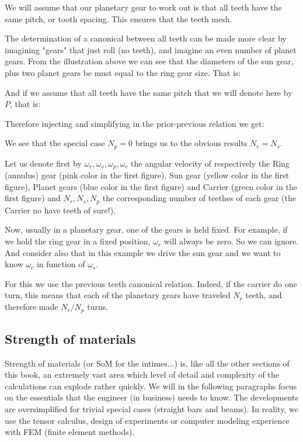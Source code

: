 	We will assume that our planetary gear to work out is that all teeth have the same pitch, or tooth spacing. This ensures that the teeth mesh.
	
	The determination of a canonical between all teeth can  be made more clear by imagining "gears" that just roll (no teeth), and imagine an even number of planet gears. From the illustration above we can see that the diameters of the sun gear, plus two planet gears be must equal to the ring gear size. That is:
	
	And if we assume that all teeth have the same pitch that we will denote here by $P$, that is:
	
	Therefore injecting and simplifying in the prior-previous relation we get:
	
	We see that the special case $N_p=0$ brings us to the obvious results $N_r=N_s$.
	
	Let us denote first by $\omega_r,\omega_s,\omega_p,\omega_c$  the angular velocity of respectively the Ring (annulus) gear (pink color in the first figure), Sun gear (yellow color in the first figure), Planet gears (blue color in the first figure) and Carrier (green color in the first figure) and $N_r,N_s,N_p$ the corresponding number of teethes of each gear (the Carrier no have teeth of sure!).
	
	Now, usually in a planetary gear, one of the gears is held fixed. For example, if we hold the ring gear in a fixed position, $\omega_r$ will always be zero. So we can ignore. And consider also that in this example we drive the sun gear and we want to know $\omega_c$ in function of $\omega_s$.
	
	For this we use the previous teeth canonical relation. Indeed, if the carrier do one turn, this means that each of the planetary gears have traveled $N_r$ teeth, and therefore made $N_r/N_p$ turns. 
	
	
	\pagebreak
	\subsection{Strength of materials}
	Strength of materials (or SoM for the intimes...) is, like all the other sections of this book, an extremely vast area which level of detail and complexity of the calculations can explode rather quickly. We will in the following paragraphs focus on the essentials that the engineer (in business) needs to know. The developments are oversimplified for trivial special cases (straight bars and beams). In reality, we use the tensor calculus, design of experiments or computer modeling experience with FEM (finite element methods).
	
